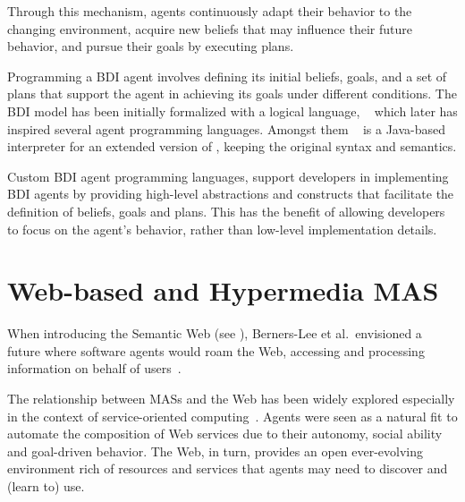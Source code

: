 Through this mechanism, agents continuously adapt their behavior to the changing environment, acquire new beliefs that may influence their future behavior, and pursue their goals by executing plans.

Programming a \ac{BDI} agent involves defining its initial beliefs, goals, and a set of plans that support the agent in achieving its goals under different conditions. 
%
The \ac{BDI} model has been initially formalized with a logical language, \agentspeak{}~\cite{raoagentspeak} which later has inspired several agent programming languages. 
%
Amongst them \jason{}~\cite{Bordini_Hübner_Wooldridge_2007} is a Java-based interpreter for an extended version of \agentspeak{}, keeping the original syntax and semantics.

Custom \ac{BDI} agent programming languages, support developers in implementing \ac{BDI} agents by providing high-level abstractions and constructs that facilitate the definition of beliefs, goals and plans. 
%
This has the benefit of allowing developers to focus on the agent's behavior, rather than low-level implementation details. 





\section{Web-based and Hypermedia \acs{MAS}}

When introducing the Semantic Web (see ), Berners-Lee et al.\ envisioned a future where software agents would roam the Web, accessing and processing information on behalf of users~\cite{berners2023semantic,Hendler_2001}.

The relationship between \acp{MAS} and the Web has been widely explored especially in the context of service-oriented computing~\cite{Singh2004}.
%
Agents were seen as a natural fit to automate the composition of Web services due to their autonomy, social ability and goal-driven behavior.
%
The Web, in turn, provides an open ever-evolving environment rich of resources and services that agents may need to discover and (learn to) use. 

